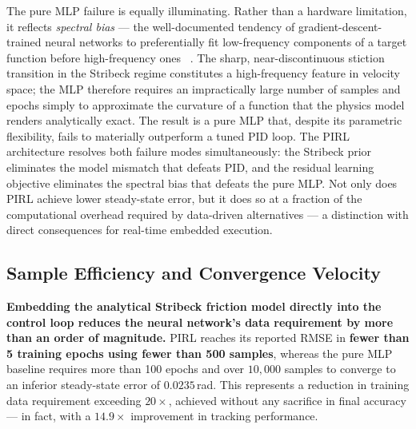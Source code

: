 \documentclass[11pt, a4paper]{article}
\begin{document}
The pure MLP failure is equally illuminating. Rather than a hardware
limitation, it reflects \emph{spectral bias} --- the well-documented
tendency of gradient-descent-trained neural networks to preferentially fit
low-frequency components of a target function before high-frequency ones~%
\citep{rahaman2019spectralbiasneuralnetworks}. The sharp, near-discontinuous
stiction transition in the Stribeck regime constitutes a high-frequency
feature in velocity space; the MLP therefore requires an impractically
large number of samples and epochs simply to approximate the curvature of
a function that the physics model renders analytically exact. The result is
a pure MLP that, despite its parametric flexibility, fails to materially
outperform a tuned PID loop. The PIRL architecture resolves both failure
modes simultaneously: the Stribeck prior eliminates the model mismatch that
defeats PID, and the residual learning objective eliminates the spectral
bias that defeats the pure MLP. Not only does PIRL achieve lower
steady-state error, but it does so at a fraction of the computational
overhead required by data-driven alternatives --- a distinction with direct
consequences for real-time embedded execution.

\subsection{Sample Efficiency and Convergence Velocity}
\label{sec:efficiency}

\textbf{Embedding the analytical Stribeck friction model directly into the
control loop reduces the neural network's data requirement by more than an
order of magnitude.} PIRL reaches its reported RMSE in \textbf{fewer than
5 training epochs using fewer than 500 samples}, whereas the pure MLP
baseline requires more than 100 epochs and over $10{,}000$ samples to
converge to an inferior steady-state error of $0.0235$\,rad. This
represents a reduction in training data requirement exceeding $20\times$,
achieved without any sacrifice in final accuracy --- in fact, with a
$14.9\times$ improvement in tracking performance.
\end{document}
